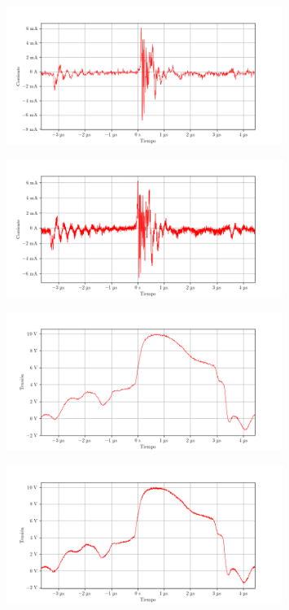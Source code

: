 \begin{figure}[ht]
    \centering
    \includegraphics[width=0.8\textwidth]{images/capturas-osciloscopio/17-11-2022/29.png}
    \caption{}
    \label{fig:osc:29}
\end{figure}

\begin{figure}[ht]
    \centering
    \includegraphics[width=0.8\textwidth]{images/capturas-osciloscopio/17-11-2022/30.png}
    \caption{}
    \label{fig:osc:30}
\end{figure}

\begin{figure}[ht]
    \centering
    \includegraphics[width=0.8\textwidth]{images/capturas-osciloscopio/17-11-2022/31.png}
    \caption{}
    \label{fig:osc:31}
\end{figure}

\begin{figure}[ht]
    \centering
    \includegraphics[width=0.8\textwidth]{images/capturas-osciloscopio/17-11-2022/32.png}
    \caption{}
    \label{fig:osc:32}
\end{figure}

